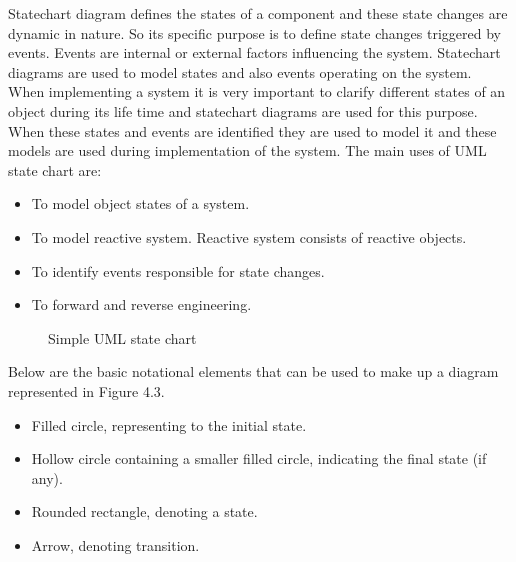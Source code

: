 Statechart diagram defines the states of a component and these state changes are dynamic in nature. So its specific purpose is to define state changes triggered by events. Events are internal or external factors influencing the system. Statechart diagrams are used to model states and also events operating on the system. When implementing a system it is very important to clarify different states of an object during its life time and statechart diagrams are used for this purpose. When these states and events are identified they are used to model it and these models are used during implementation of the system. The main uses of UML state chart are:
\begin{itemize}
	\item To model object states of a system.
	\item To model reactive system. Reactive system consists of reactive objects.
	\item To identify events responsible for state changes.
	\item To forward and reverse engineering.
\end{itemize}

\begin{figure}[htbp]
	\centering
	\label{fig:simple_stateChart}
	\caption{Simple UML state chart}
\end{figure}

Below are the basic notational elements that can be used to make up a diagram represented in Figure 4.3.
\begin{itemize}
	\item Filled circle, representing to the initial state.	
	\item Hollow circle containing a smaller filled circle, indicating the final state (if any).	
	\item Rounded rectangle, denoting a state.	
	\item Arrow, denoting transition.	
\end{itemize}

